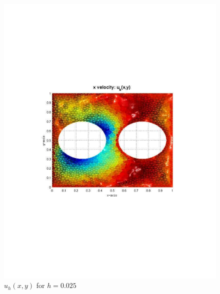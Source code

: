 \documentclass[12pt]{article}
\begin{document}
                \begin{figure}[htb]
                    \begin{center}
                \includegraphics[scale=0.50]{./../files/crazy/u.pdf}
                \caption{$u_h(x,y)$ for $h = 0.025$}
            \end{center}
            \end{figure}
\end{document}
